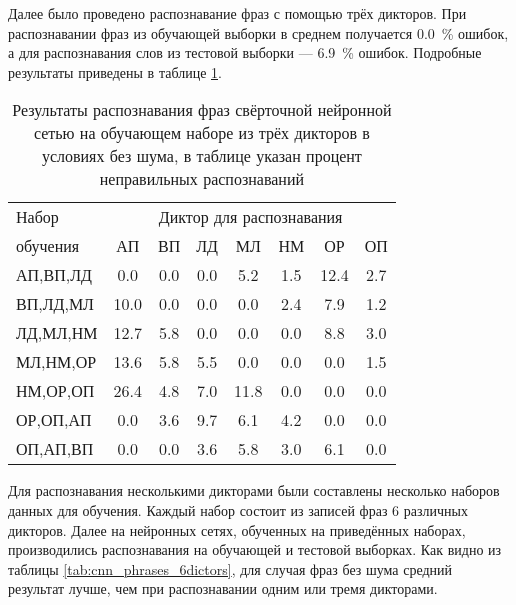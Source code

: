 Далее было проведено распознавание фраз с помощью трёх дикторов.
При распознавании фраз из обучающей выборки в среднем получается 0.0~\% ошибок, а для распознавания слов из тестовой выборки --- 6.9~\% ошибок.
Подробные результаты приведены в таблице \ref{tab:cnn_phrases_3dictors}.

\begin{table}[h]
	\centering
	\caption{Результаты распознавания фраз свёрточной нейронной сетью на обучающем наборе из трёх дикторов в условиях без шума, в таблице указан процент неправильных распознаваний}
	\label{tab:cnn_phrases_3dictors}
	\begin{tabular}{| l | c | c | c | c | c | c | c |}
		\hline
		Набор & \multicolumn{7}{c|}{Диктор для распознавания} \\
		\hhline{~-------}
		обучения \phantom{0000} & \phantom{0} АП \phantom{0} & \phantom{0} ВП \phantom{0} & \phantom{0} ЛД \phantom{0} & \phantom{0} МЛ \phantom{0} & \phantom{0} НМ \phantom{0} & \phantom{0} ОР \phantom{0} & \phantom{0} ОП \phantom{0} \\
		\hline
		АП,ВП,ЛД &  0.0 &  0.0 &  0.0 &  5.2 &  1.5 & 12.4 &  2.7 \\
		ВП,ЛД,МЛ & 10.0 &  0.0 &  0.0 &  0.0 &  2.4 &  7.9 &  1.2 \\
		ЛД,МЛ,НМ & 12.7 &  5.8 &  0.0 &  0.0 &  0.0 &  8.8 &  3.0 \\
		МЛ,НМ,ОР & 13.6 &  5.8 &  5.5 &  0.0 &  0.0 &  0.0 &  1.5 \\
		НМ,ОР,ОП & 26.4 &  4.8 &  7.0 & 11.8 &  0.0 &  0.0 &  0.0 \\
		ОР,ОП,АП &  0.0 &  3.6 &  9.7 &  6.1 &  4.2 &  0.0 &  0.0 \\
		ОП,АП,ВП &  0.0 &  0.0 &  3.6 &  5.8 &  3.0 &  6.1 &  0.0 \\
		\hline
	\end{tabular}
\end{table}

Для распознавания несколькими дикторами были составлены несколько наборов данных для обучения.
Каждый набор состоит из записей фраз 6 различных дикторов.
Далее на нейронных сетях, обученных на приведённых наборах, производились распознавания на обучающей и тестовой выборках.
Как видно из таблицы \ref{tab:cnn_phrases_6dictors}, для случая фраз без шума средний результат лучше, чем при распознавании одним или тремя дикторами.

